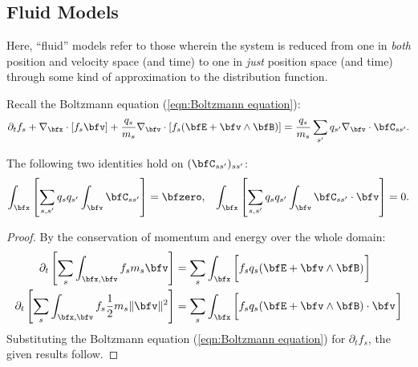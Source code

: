 \subsection*{Fluid Models}\label{cha:fluid models}
    \line

    \begin{definition}
        Here, ``fluid'' models refer to those wherein the system is reduced from one in \emph{both} position and velocity space (and time) to one in \emph{just} position space (and time) through some kind of approximation to the distribution function.
    \end{definition}

    \line
    
    Recall the Boltzmann equation (\ref{eqn:Boltzmann equation}):
    \begin{equation*}
        \partial_{t}f_{s} + \nabla_{\bfx}\cdot[f_{s}\bfv] + \frac{q_{s}}{m_{s}}\nabla_{\bfv}\cdot[f_{s}(\bfE + \bfv\wedge\bfB)]  =  \frac{q_{s}}{m_{s}}\sum_{s'}q_{s'}\nabla_{\bfv}\cdot\bfC_{ss'}.
    \end{equation*}

    \line

    \begin{lemma}
        The following two identities hold on $(\bfC_{ss'})_{ss'}$:
        \begin{align}
            \int_{\bfx}\left[\sum_{s, s'}q_{s}q_{s'}\int_{\bfv}\bfC_{ss'}\right]           =  \bfzero,  &&
            \int_{\bfx}\left[\sum_{s, s'}q_{s}q_{s'}\int_{\bfv}\bfC_{ss'}\cdot\bfv\right]  =  0.
        \end{align}
    \end{lemma}
    \begin{proof}
        By the conservation of momentum and energy over the whole domain:
        \begin{align}
            \partial_{t}\left[\sum_{s}\int_{\bfx, \bfv}f_{s}m_{s}\bfv\right]                     &=  \sum_{s}\int_{\bfx}\left[f_{s}q_{s}(\bfE + \bfv\wedge\bfB)\tall\right]  \\
            \partial_{t}\left[\sum_{s}\int_{\bfx, \bfv}f_{s}\frac{1}{2}m_{s}\|\bfv\|^{2}\right]  &=  \sum_{s}\int_{\bfx}\left[f_{s}q_{s}(\bfE + \bfv\wedge\bfB)\cdot\bfv\tall\right]
        \end{align}
        Substituting the Boltzmann equation (\ref{eqn:Boltzmann equation}) for $\partial_{t}f_{s}$, the given results follow.
    \end{proof}

